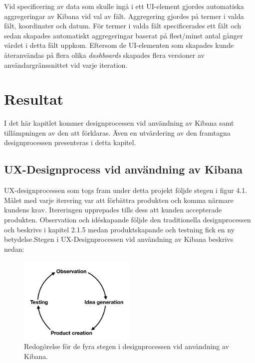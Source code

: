 \documentclass[12pt]{kththesis}
\begin{document}
Vid specificering av data som skulle ingå i ett UI-element gjordes automatiska aggregeringar av Kibana vid val av fält. Aggregering gjordes på termer i valda fält, koordinater och datum. För termer i valda fält specificerades ett fält och sedan skapades automatiskt aggregeringar baserat på flest/minst antal gånger värdet i detta fält uppkom. Eftersom de UI-elementen som skapades kunde återanvändas på flera olika \textit{dashboards} skapades flera versioner av användargränssnittet vid varje iteration. 


\afterpage{\null\newpage}

\chapter{Resultat}

I det här kapitlet kommer designprocessen vid användning av Kibana samt tillämpningen av den att förklaras. Även en utvärdering av den framtagna designprocessen presenteras i detta kapitel.  

\section{UX-Designprocess vid användning av Kibana}

UX-designprocessen som togs fram under detta projekt följde stegen i figur 4.1. Målet med varje iterering var att förbättra produkten och komma närmare kundens krav. Itereringen upprepades tills dess att kunden accepterade produkten. Observation och idéskapande följde den traditionella designprocessen och beskrivs i kapitel 2.1.5 medan produktskapande och testning fick en ny betydelse.Stegen i UX-Designprocessen vid användning av Kibana beskrivs nedan:

\begin{figure}[h]

\centering
\includegraphics[width=0.5\textwidth]{ProductCreation}
\caption{Redogörelse för de fyra stegen i designprocessen vid användning av Kibana.}
\end{figure}
\end{document}
